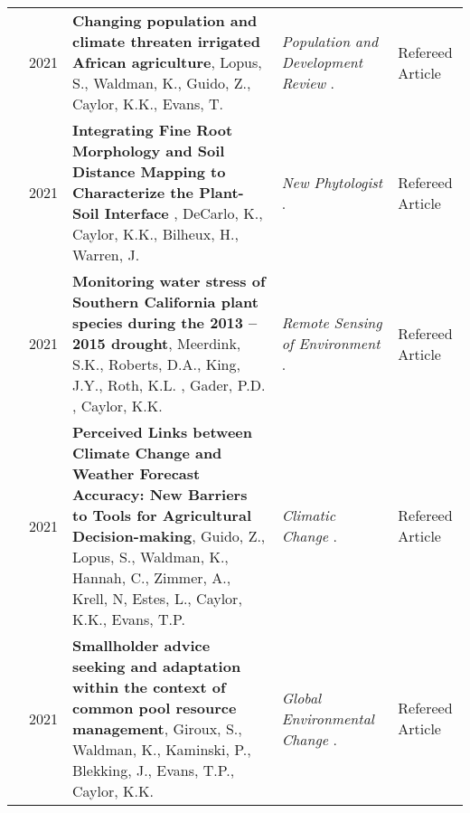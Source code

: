 \begin{longtable}{lcp{7.75cm}>{\raggedright}p{5.25cm}p{1.75cm}}
     & 2021 & {\bf Changing population and climate threaten irrigated African agriculture}, Lopus, S., Waldman, K., Guido, Z., Caylor, K.K., Evans, T.  & \emph{ Population and Development Review } .   & Refereed Article\\
     & 2021 & {\bf Integrating Fine Root Morphology and Soil Distance Mapping to Characterize the Plant-Soil Interface }, DeCarlo, K., Caylor, K.K., Bilheux, H., Warren, J.  & \emph{ New Phytologist } .   & Refereed Article\\
     & 2021 & {\bf Monitoring water stress of Southern California plant species during the 2013 – 2015 drought}, Meerdink, S.K., Roberts, D.A., King, J.Y., Roth, K.L. , Gader, P.D. , Caylor, K.K.  & \emph{ Remote Sensing of Environment } .   & Refereed Article\\
     & 2021 & {\bf Perceived Links between Climate Change and Weather Forecast Accuracy: New Barriers to Tools for Agricultural Decision-making}, Guido, Z., Lopus, S., Waldman, K., Hannah, C., Zimmer, A., Krell, N, Estes, L., Caylor, K.K., Evans, T.P.  & \emph{ Climatic Change } .   & Refereed Article\\
     & 2021 & {\bf Smallholder advice seeking and adaptation within the context of common pool resource management}, Giroux, S., Waldman, K., Kaminski, P., Blekking, J., Evans, T.P., Caylor, K.K.  & \emph{ Global Environmental Change } .   & Refereed Article\\
\end{longtable}

